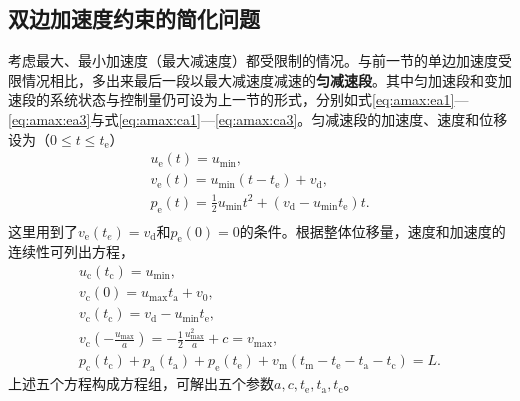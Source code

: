 \subsection{双边加速度约束的简化问题}
考虑最大、最小加速度（最大减速度）都受限制的情况。与前一节的单边加速度受限情况相比，多出来最后一段以最大减速度减速的\textbf{匀减速段}。其中匀加速段和变加速段的系统状态与控制量仍可设为上一节的形式，分别如式\eqref{eq:amax:ea1}---\eqref{eq:amax:ea3}与式\eqref{eq:amax:ca1}---\eqref{eq:amax:ca3}。匀减速段的加速度、速度和位移设为（$0\leq t\leq t_\mathrm{e}$）
\begin{gather}
u_\mathrm{e}(t)=u_{\min},\\
v_\mathrm{e}(t)=u_{\min}(t-t_\mathrm{e})+v_\mathrm{d},\\
p_\mathrm{e}(t)=\frac12 u_{\min}t^2+(v_\mathrm{d}-u_{\min}t_\mathrm{e})t.\\
\end{gather}
这里用到了$v_\mathrm{e}(t_e)=v_\mathrm{d}$和$p_\mathrm{e}(0)=0$的条件。根据整体位移量，速度和加速度的连续性可列出方程，
\begin{gather}
u_\mathrm{c}(t_\mathrm{c})=u_{\min},\label{eq:amin:1}\\
v_\mathrm{c}(0)=u_{\max}t_\mathrm{a}+v_0,\\
v_\mathrm{c}(t_\mathrm{c})=v_\mathrm{d}-u_{\min}t_\mathrm{e},\\
v_\mathrm{c}(-\frac{u_{\max}}{a})=-\frac12\frac{u_{\max}^2}{a}+c=v_\mathrm{max},\\
p_\mathrm{c}(t_\mathrm{c})+p_\mathrm{a}(t_\mathrm{a})+p_\mathrm{e}(t_\mathrm{e})+v_\mathrm{m}(t_\mathrm{m}-t_\mathrm{e}-t_\mathrm{a}-t_\mathrm{c})=L.\label{eq:amin:5}
\end{gather}
上述五个方程构成方程组，可解出五个参数$a,c,t_\mathrm{e},t_\mathrm{a},t_\mathrm{c}$。


